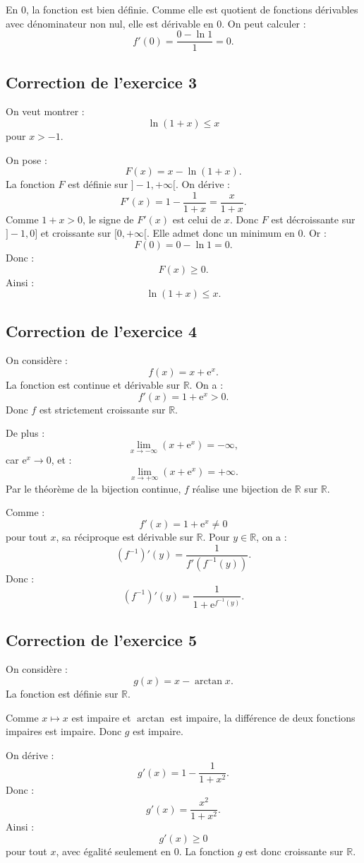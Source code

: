 \documentclass[11pt,a4paper]{article}
\newcommand{\R}{\mathbb R}
\newcommand{\e}{\mathrm e}
\begin{document}
En \(0\), la fonction est bien définie.  
Comme elle est quotient de fonctions dérivables avec dénominateur non nul, elle est dérivable en \(0\).  
On peut calculer :
\[
f'(0)=
\frac{0-\ln1}{1}
=
0.
\]

\subsection*{Correction de l'exercice 3}

On veut montrer :
\[
\ln(1+x)\leq x
\]
pour \(x>-1\).

On pose :
\[
F(x)=x-\ln(1+x).
\]
La fonction \(F\) est définie sur \(]-1,+\infty[\).  
On dérive :
\[
F'(x)=1-\frac1{1+x}
=
\frac{x}{1+x}.
\]
Comme \(1+x>0\), le signe de \(F'(x)\) est celui de \(x\).  
Donc \(F\) est décroissante sur \(]-1,0]\) et croissante sur \([0,+\infty[\).  
Elle admet donc un minimum en \(0\).  
Or :
\[
F(0)=0-\ln1=0.
\]
Donc :
\[
F(x)\geq0.
\]
Ainsi :
\[
\ln(1+x)\leq x.
\]

\subsection*{Correction de l'exercice 4}

On considère :
\[
f(x)=x+\e^x.
\]
La fonction est continue et dérivable sur \(\R\).  
On a :
\[
f'(x)=1+\e^x>0.
\]
Donc \(f\) est strictement croissante sur \(\R\).

De plus :
\[
\lim_{x\to-\infty}(x+\e^x)=-\infty,
\]
car \(\e^x\to0\), et :
\[
\lim_{x\to+\infty}(x+\e^x)=+\infty.
\]
Par le théorème de la bijection continue, \(f\) réalise une bijection de \(\R\) sur \(\R\).

Comme :
\[
f'(x)=1+\e^x\neq0
\]
pour tout \(x\), sa réciproque est dérivable sur \(\R\).  
Pour \(y\in\R\), on a :
\[
(f^{-1})'(y)=\frac1{f'(f^{-1}(y))}.
\]
Donc :
\[
(f^{-1})'(y)=\frac1{1+\e^{f^{-1}(y)}}.
\]

\subsection*{Correction de l'exercice 5}

On considère :
\[
g(x)=x-\arctan x.
\]
La fonction est définie sur \(\R\).

Comme \(x\mapsto x\) est impaire et \(\arctan\) est impaire, la différence de deux fonctions impaires est impaire.  
Donc \(g\) est impaire.

On dérive :
\[
g'(x)=1-\frac1{1+x^2}.
\]
Donc :
\[
g'(x)=\frac{x^2}{1+x^2}.
\]
Ainsi :
\[
g'(x)\geq0
\]
pour tout \(x\), avec égalité seulement en \(0\).  
La fonction \(g\) est donc croissante sur \(\R\).
\end{document}
